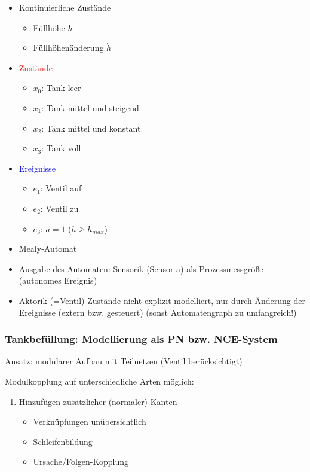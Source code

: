 \begin{itemize}
	\item Kontinuierliche Zustände
	\begin{itemize}
		\item Füllhöhe $h$
		\item Füllhöhenänderung $\dot{h}$
	\end{itemize}
	\item \textcolor{red}{Zustände}
	\begin{itemize}
		\item $x_0$: Tank leer
		\item $x_1$: Tank mittel und steigend
		\item $x_2$: Tank mittel und konstant
		\item $x_3$: Tank voll
	\end{itemize}
	\item \textcolor{blue}{Ereignisse}
	\begin{itemize}
		\item $e_1$: Ventil auf 
		\item $e_2$: Ventil zu
		\item $e_3$: $a=1$ ($h \ge h_{max}$)
	\end{itemize}
\end{itemize}

\begin{itemize}
	\item Mealy-Automat
	\item Ausgabe des Automaten: Sensorik (Sensor a) als Prozessmessgröße (autonomes Ereignis)
	\item Aktorik (=Ventil)-Zustände nicht explizit modelliert, nur durch Änderung der Ereignisse (extern bzw. gesteuert) (sonst Automatengraph zu umfangreich!)
\end{itemize}

\subsubsection{Tankbefüllung: Modellierung als PN bzw. NCE-System}
Ansatz: modularer Aufbau mit Teilnetzen (Ventil berücksichtigt) 

Modulkopplung auf unterschiedliche Arten möglich:

\begin{enumerate}
	\item \underline{Hinzufügen zusätzlicher (normaler) Kanten}
	
	
	
	
	\begin{itemize}
		\item Verknüpfungen unübersichtlich
		\item Schleifenbildung
		\item Ursache/Folgen-Kopplung
	\end{itemize}
\end{enumerate}

